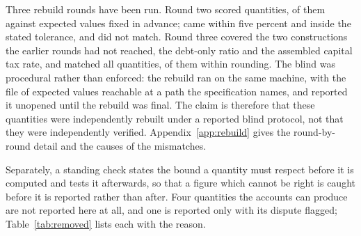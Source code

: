 Three rebuild rounds have been run. Round two scored  quantities,
 of them against expected values fixed in advance; 
came within five percent and  inside the stated tolerance, and
 did not match. Round three covered the two constructions the earlier
rounds had not reached, the debt-only ratio and the assembled capital tax rate, and matched all
 quantities,  of them within rounding. The blind
was procedural rather than enforced: the rebuild ran on the same machine, with the file of
expected values reachable at a path the specification names, and reported it unopened until the
rebuild was final. The claim is therefore that these quantities were independently rebuilt under
a reported blind protocol, not that they were independently verified.
Appendix~\ref{app:rebuild} gives the round-by-round detail and the causes of the mismatches.

Separately, a standing check states the bound a quantity must respect before it is computed and
tests it afterwards, so that a figure which cannot be right is caught before it is reported
rather than after. Four quantities the accounts can produce are not reported here at all, and one is
reported only with its dispute flagged; Table~\ref{tab:removed} lists each with
the reason.
